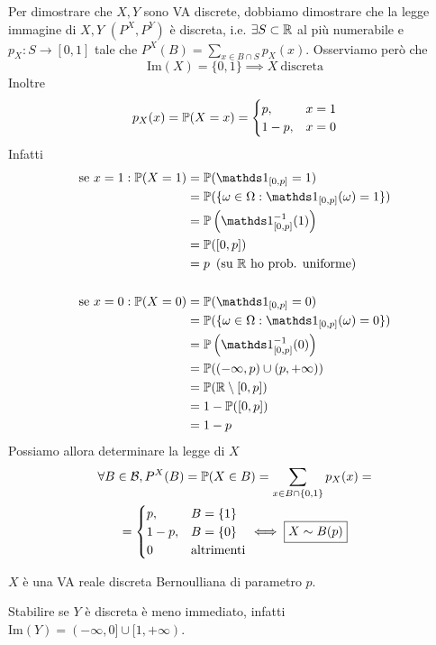 \begin{enumerate}
Per dimostrare che $X,Y$ sono VA discrete, dobbiamo dimostrare che la legge immagine di $X,Y$ $\left(P^{X} ,P^{Y}\right)$ è discreta, i.e. $\exists S\subset \mathbb{R}$ al più numerabile e $p_{X} :S\rightarrow [0,1]$ tale che $P^{X}(B) =\sum\limits_{x\in B\cap S} p_{X}(x)$. Osserviamo però che
\begin{equation*}
\mathrm{Im}(X) =\{0,1\} \implies X\ \text{discreta}
\end{equation*}
Inoltre
\begin{equation*}
p_{X}(x) =\mathbb{P}(X=x) =
\begin{cases}
p, & x=1\\
1-p, & x=0
\end{cases}
\end{equation*}
Infatti
\begin{align*}
\text{se} \ x=1:\PP(X=1) & =\PP(\Ind_{[0,p]} =1)\\
 & =\PP(\{\omega \in \Omega :\Ind_{[0,p]}(\omega) =1\})\\
 & =\PP\left(\Ind_{[0,p]}^{-1}(1)\right)\\
 & =\PP([0,p])\\
 & =p\ \left(\text{su} \ \RR \ \text{ho prob. uniforme}\right)\\
 & \\
\text{se} \ x=0:\PP(X=0) & =\PP(\Ind_{[0,p]} =0)\\
 & =\PP(\{\omega \in \Omega :\Ind_{[0,p]}(\omega) =0\})\\
 & =\PP\left(\Ind_{[0,p]}^{-1}(0)\right)\\
 & =\PP((-\infty ,p) \cup (p,+\infty))\\
 & =\PP(\RR \setminus [0,p])\\
 & =1-\PP([0,p])\\
 & =1-p
\end{align*}
Possiamo allora determinare la legge di $X$
\begin{gather*}
\forall B\in \mathcal{B} ,P^{X}(B) =\mathbb{P}(X\in B) =\sum\limits_{x\in B\cap \{0,1\}} p_{X}(x) =\\
=
\begin{cases}
p, & B=\{1\}\\
1-p, & B=\{0\}\\
0 & \text{altrimenti}
\end{cases}
\iff \boxed{X\sim B(p)}
\end{gather*}

$X$ è una VA reale discreta Bernoulliana di parametro $p$.

Stabilire se $Y$ è discreta è meno immediato, infatti $\mathrm{Im}(Y) =(-\infty ,0] \cup [ 1,+\infty)$.


\end{enumerate}
